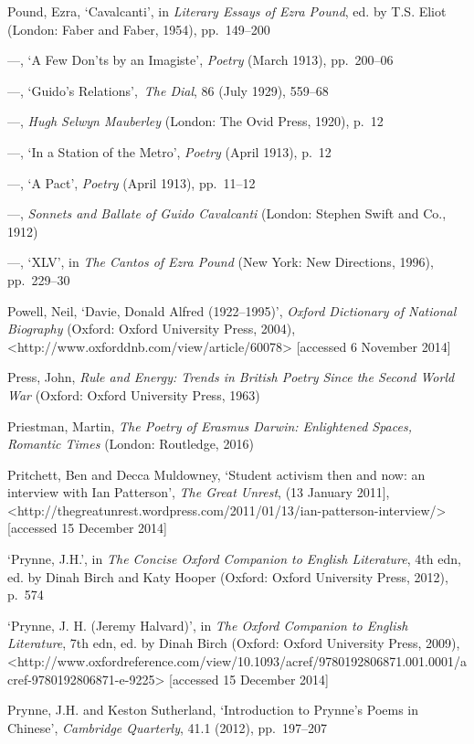 \documentclass[]{article}
\begin{document}
Pound, Ezra, `Cavalcanti', in \emph{Literary Essays of Ezra Pound}, ed.
by T.S. Eliot (London: Faber and Faber, 1954), pp.~149--200

---, `A Few Don'ts by an Imagiste', \emph{Poetry} (March 1913),
pp.~200--06

---, `Guido's Relations',~\emph{The Dial}, 86 (July 1929), 559--68

---, \emph{Hugh Selwyn Mauberley} (London: The Ovid Press, 1920), p.~12

---, `In a Station of the Metro', \emph{Poetry} (April 1913), p.~12

---, `A Pact', \emph{Poetry} (April 1913), pp.~11--12

---, \emph{Sonnets and Ballate of Guido Cavalcanti} (London: Stephen
Swift and Co., 1912)

---, `XLV', in \emph{The Cantos of Ezra Pound} (New York: New
Directions, 1996), pp.~229--30

Powell, Neil, `Davie, Donald Alfred (1922--1995)', \emph{Oxford
Dictionary of National Biography} (Oxford: Oxford University Press,
2004),\\
\textless{}http://www.oxforddnb.com/view/article/60078\textgreater{}
{[}accessed 6 November 2014{]}

Press, John, \emph{Rule and Energy: Trends in British Poetry Since the
Second World War} (Oxford: Oxford University Press, 1963)

Priestman, Martin, \emph{The Poetry of Erasmus Darwin: Enlightened
Spaces, Romantic Times} (London: Routledge, 2016)

Pritchett, Ben and Decca Muldowney, `Student activism then and now: an
interview with Ian Patterson', \emph{The Great Unrest}, (13 January
2011{]},\\
\textless{}http://thegreatunrest.wordpress.com/2011/01/13/ian-patterson-interview/\textgreater{}
{[}accessed 15 December 2014{]}

`Prynne, J.H.', in \emph{The Concise Oxford Companion to English
Literature}, 4th edn, ed. by Dinah Birch and Katy Hooper (Oxford: Oxford
University Press, 2012), p.~574

`Prynne, J. H. (Jeremy Halvard)', in \emph{The Oxford Companion to
English Literature}, 7th edn, ed. by Dinah Birch (Oxford: Oxford
University Press, 2009),\\
\textless{}http://www.oxfordreference.com/view/10.1093/acref/9780192806871.001.0001/acref-9780192806871-e-9225\textgreater{}
{[}accessed 15 December 2014{]}

Prynne, J.H. and Keston Sutherland, `Introduction to Prynne's Poems in
Chinese', \emph{Cambridge Quarterly}, 41.1 (2012), pp.~197--207
\end{document}
